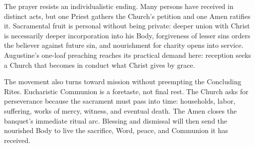The prayer resists an individualistic ending. Many persons have received in distinct acts, but one Priest gathers the Church's petition and one Amen ratifies it. Sacramental fruit is personal without being private: deeper union with Christ is necessarily deeper incorporation into his Body, forgiveness of lesser sins orders the believer against future sin, and nourishment for charity opens into service. Augustine's one-loaf preaching reaches its practical demand here: reception seeks a Church that becomes in conduct what Christ gives by grace.

The movement also turns toward mission without preempting the Concluding Rites. Eucharistic Communion is a foretaste, not final rest. The Church asks for perseverance because the sacrament must pass into time: households, labor, suffering, works of mercy, witness, and eventual death. The Amen closes the banquet's immediate ritual arc. Blessing and dismissal will then send the nourished Body to live the sacrifice, Word, peace, and Communion it has received.
